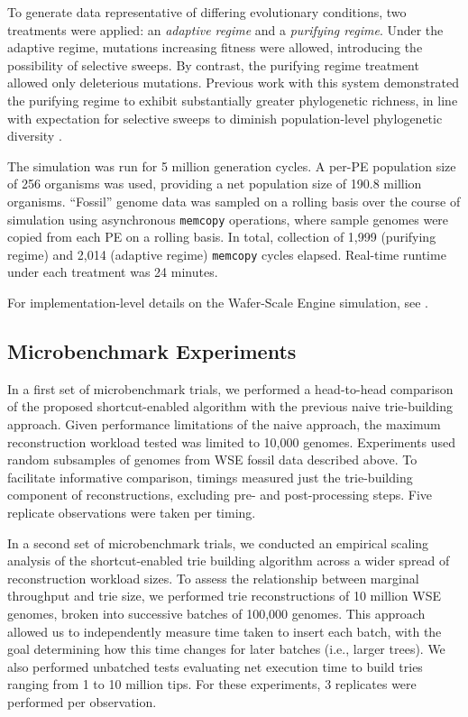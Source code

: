 To generate data representative of differing evolutionary conditions, two treatments were applied: an
\textit{adaptive regime} and a \textit{purifying regime}.
Under the adaptive regime, mutations increasing fitness were allowed, introducing the possibility of selective sweeps.
By contrast, the purifying regime treatment allowed only deleterious mutations.
Previous work with this system demonstrated the purifying regime to exhibit substantially greater phylogenetic richness, in line with expectation for selective sweeps to diminish population-level phylogenetic diversity \citep{moreno2024trackable}.

The simulation was run for 5 million generation cycles.
A per-PE population size of 256 organisms was used, providing a net population size of 190.8 million organisms.
``Fossil'' genome data was sampled on a rolling basis over the course of simulation using asynchronous \texttt{memcopy} operations, where sample genomes were copied from each PE on a rolling basis.
In total, collection of 1,999 (purifying regime) and 2,014 (adaptive regime) \texttt{memcopy} cycles elapsed.
Real-time runtime under each treatment was 24 minutes.

For implementation-level details on the Wafer-Scale Engine simulation, see \citep{moreno2024trackable}.

\subsection{Microbenchmark Experiments}

In a first set of microbenchmark trials, we performed a head-to-head comparison of the proposed shortcut-enabled algorithm with the previous naive trie-building approach.
Given performance limitations of the naive approach, the maximum reconstruction workload tested was limited to 10,000 genomes.
Experiments used random subsamples of genomes from WSE fossil data described above.
To facilitate informative comparison, timings measured just the trie-building component of reconstructions, excluding pre- and post-processing steps.
Five replicate observations were taken per timing.

In a second set of microbenchmark trials, we conducted an empirical scaling analysis of the shortcut-enabled trie building algorithm across a wider spread of reconstruction workload sizes.
To assess the relationship between marginal throughput and trie size, we performed trie reconstructions of 10 million WSE genomes, broken into successive batches of 100,000 genomes.
This approach allowed us to independently measure time taken to insert each batch, with the goal determining how this time changes for later batches (i.e., larger trees).
We also performed unbatched tests evaluating net execution time to build tries ranging from 1 to 10 million tips.
For these experiments, 3 replicates were performed per observation.

